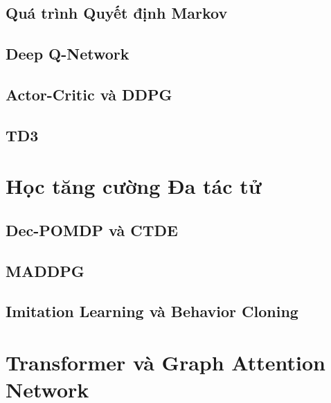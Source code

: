 \subsection{Quá trình Quyết định Markov}
\label{subsec:bg:rl:mdp}

\subsection{Deep Q-Network}
\label{subsec:bg:rl:dqn}

\subsection{Actor-Critic và DDPG}
\label{subsec:bg:rl:ddpg}

\subsection{TD3}
\label{subsec:bg:rl:td3}

\section{Học tăng cường Đa tác tử}
\label{sec:bg:marl}

\subsection{Dec-POMDP và CTDE}
\label{subsec:bg:marl:decpomdp}

\subsection{MADDPG}
\label{subsec:bg:marl:maddpg}

\subsection{Imitation Learning và Behavior Cloning}
\label{subsec:bg:marl:il}

\section{Transformer và Graph Attention Network}
\label{sec:bg:transformer-gat}

